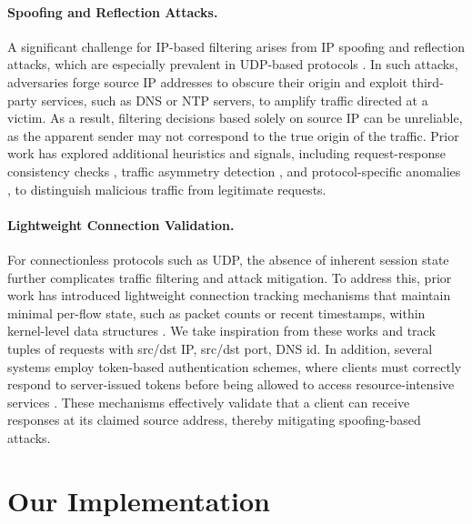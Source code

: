 \documentclass[twocolumn, 10pt]{scrartcl}
\begin{document}
\paragraph{Spoofing and Reflection Attacks.}
 A significant challenge for IP-based filtering arises from IP spoofing and reflection attacks, which are especially prevalent in UDP-based protocols \citep{ferguson1998network, liu2015detect}. In such attacks, adversaries forge source IP addresses to obscure their origin and exploit third-party services, such as DNS or NTP servers, to amplify traffic directed at a victim. As a result, filtering decisions based solely on source IP can be unreliable, as the apparent sender may not correspond to the true origin of the traffic. Prior work has explored additional heuristics and signals, including request-response consistency checks \citep{hay2026react}, traffic asymmetry detection \citep{hay2026react, zhang2020poseidon}, and protocol-specific anomalies \citep{kambourakis2007detecting}, to distinguish malicious traffic from legitimate requests.
\paragraph{Lightweight Connection Validation.}
 For connectionless protocols such as UDP, the absence of inherent session state further complicates traffic filtering and attack mitigation. To address this, prior work has introduced lightweight connection tracking mechanisms that maintain minimal per-flow state, such as packet counts or recent timestamps, within kernel-level data structures \citep{welte2004ct_sync, finamore2010kiss}. We take inspiration from these works and track tuples of requests with src/dst IP, src/dst port, DNS id. In addition, several systems employ token-based authentication schemes, where clients must correctly respond to server-issued tokens before being allowed to access resource-intensive services \citep{yoo2024smartcookie}. These mechanisms effectively validate that a client can receive responses at its claimed source address, thereby mitigating spoofing-based attacks.

\section{Our Implementation}
\end{document}
